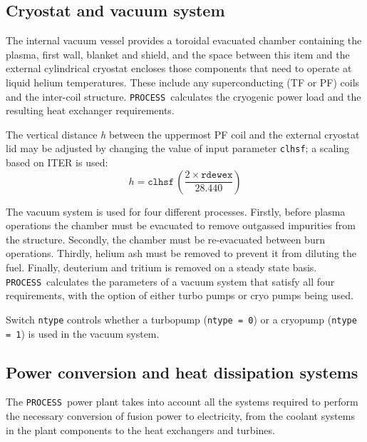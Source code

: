 \documentclass[11pt,a4paper]{report}
\newcommand{\process}{\mbox{\texttt{PROCESS}}}
\begin{document}
\subsection{Cryostat and vacuum system}

The internal vacuum vessel provides a toroidal evacuated chamber containing
the plasma, first wall, blanket and shield, and the space between this item
and the external cylindrical cryostat encloses those components that need to
operate at liquid helium temperatures. These include any superconducting (TF
or PF) coils and the inter-coil structure. \process\ calculates the cryogenic
power load and the resulting heat exchanger requirements.

The vertical distance \textit{h}\/ between the uppermost PF coil and the
external cryostat lid may be adjusted by changing the value of input parameter
\texttt{clhsf}; a scaling based on ITER is used:
\begin{equation}
h = \mathtt{clhsf} \, \left( \frac{2 \times \mathtt{rdewex}}{28.440} \right)
\end{equation}

The vacuum system is used for four different processes. Firstly, before plasma
operations the chamber must be evacuated to remove outgassed impurities from
the structure. Secondly, the chamber must be re-evacuated between burn
operations. Thirdly, helium ash must be removed to prevent it from diluting
the fuel. Finally, deuterium and tritium is removed on a steady state
basis. \process\ calculates the parameters of a vacuum system that satisfy
all four requirements, with the option of either turbo pumps or cryo pumps
being used.

Switch \texttt{ntype} controls whether a turbopump (\texttt{ntype = 0}) or a
cryopump (\texttt{ntype = 1}) is used in the vacuum system.

\subsection{Power conversion and heat dissipation systems}
\label{sec:powerflow}

The \process\ power plant takes into account all the systems required to
perform the necessary conversion of fusion power to electricity, from the
coolant systems in the plant components to the heat exchangers and turbines.
%
%
\end{document}
